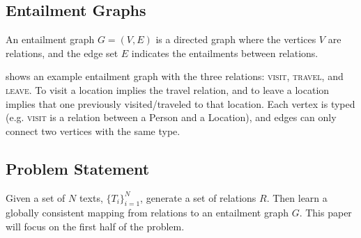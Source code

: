 \subsection{Entailment Graphs}
An entailment graph $G=(V,E)$ is a directed graph where the vertices $V$
are relations, and the edge set $E$ indicates the entailments between
relations.

 shows an example entailment graph with the three relations:
\textsc{visit}, \textsc{travel}, and \textsc{leave}. 
To visit a location implies the travel relation,
and to leave a location implies that one previously visited/traveled to that
location. Each vertex is typed (e.g. \textsc{visit} is a relation between
a Person and a Location), and edges can only connect two vertices with
the same type.

\subsection{Problem Statement}
Given a set of $N$ texts, $\{T_i\}_{i=1}^{N}$, generate a set of 
relations $R$. Then learn a globally consistent mapping
from relations to an entailment graph $G$. This paper will focus
on the first half of the problem.


